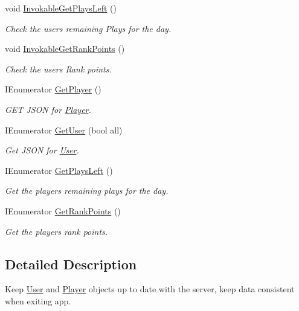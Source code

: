 \begin{DoxyCompactItemize}
\item 
void \mbox{\hyperlink{class_update_sessions_af02a599b262f2ea1e620f7ec468f8ebb}{Invokable\+Get\+Plays\+Left}} ()
\begin{DoxyCompactList}\small\item\em Check the user\textquotesingle{}s remaining Plays for the day. \end{DoxyCompactList}\item 
void \mbox{\hyperlink{class_update_sessions_a13b53f5d4ab3beafc880931c5870e740}{Invokable\+Get\+Rank\+Points}} ()
\begin{DoxyCompactList}\small\item\em Check the user\textquotesingle{}s Rank points. \end{DoxyCompactList}\item 
I\+Enumerator \mbox{\hyperlink{class_update_sessions_a2a73c7d01b39317eab0b06a3ddfb9669}{Get\+Player}} ()
\begin{DoxyCompactList}\small\item\em G\+ET J\+S\+ON for \mbox{\hyperlink{class_player}{Player}}. \end{DoxyCompactList}\item 
I\+Enumerator \mbox{\hyperlink{class_update_sessions_a0d9f725dd5bd780272f19531fcc2c523}{Get\+User}} (bool all)
\begin{DoxyCompactList}\small\item\em Get J\+S\+ON for \mbox{\hyperlink{class_user}{User}}. \end{DoxyCompactList}\item 
I\+Enumerator \mbox{\hyperlink{class_update_sessions_a9e3f91b8c328a2c75b4fd7ba38ea5c1a}{Get\+Plays\+Left}} ()
\begin{DoxyCompactList}\small\item\em Get the player\textquotesingle{}s remaining plays for the day. \end{DoxyCompactList}\item 
I\+Enumerator \mbox{\hyperlink{class_update_sessions_afe2dacd8d53c15803cca09bf07de37b7}{Get\+Rank\+Points}} ()
\begin{DoxyCompactList}\small\item\em Get the player\textquotesingle{}s rank points. \end{DoxyCompactList}\end{DoxyCompactItemize}


\subsection{Detailed Description}
Keep \mbox{\hyperlink{class_user}{User}} and \mbox{\hyperlink{class_player}{Player}} objects up to date with the server, keep data consistent when exiting app. 

